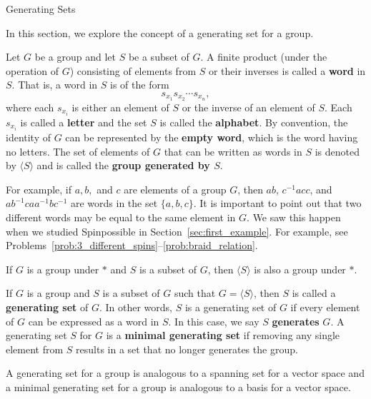 
\begin{section}{Generating Sets}


In this section, we explore the concept of a generating set for a group.

\begin{definition}
Let $G$ be a group and let $S$ be a subset of $G$. A finite product (under the operation of $G$) consisting of elements from $S$ or their inverses is called a \textbf{word} in $S$. That is, a word in $S$ is of the form
\[
s_{x_1}s_{x_2}\cdots s_{x_n},
\]
where each $s_{x_i}$ is either an element of $S$ or the inverse of an element of $S$. Each $s_{x_i}$ is called a \textbf{letter} and the set $S$ is called the \textbf{alphabet}. By convention, the identity of $G$ can be represented by the \textbf{empty word}, which is the word having no letters. The set of elements of $G$ that can be written as words in $S$ is denoted by $\langle S\rangle$ and is called the \textbf{group generated by $S$}.
\end{definition}

For example, if $a, b,$ and $c$ are elements of a group $G$, then $ab$, $c^{-1}acc$, and $ab^{-1}caa^{-1}bc^{-1}$ are words in the set $\{a,b,c\}$.  It is important to point out that two different words may be equal to the same element in $G$. We saw this happen when we studied Spinpossible in Section~\ref{sec:first_example}. For example, see Problems~\ref{prob:3_different_spins}--\ref{prob:braid_relation}.

\begin{theorem}
If $G$ is a group under $*$ and $S$ is a subset of $G$, then $\langle S\rangle$ is also a group under $*$.
\end{theorem}

\begin{definition}
If $G$ is a group and $S$ is a subset of $G$ such that $G=\langle S\rangle$, then $S$ is called a \textbf{generating set} of $G$. In other words, $S$ is a generating set of $G$ if every element of $G$ can be expressed as a word in $S$.  In this case, we say $S$ \textbf{generates} $G$.  A generating set $S$ for $G$ is a \textbf{minimal generating set} if removing any single element from $S$ results in a set that no longer generates the group.
\end{definition}

A generating set for a group is analogous to a spanning set for a vector space and a minimal generating set for a group is analogous to a basis for a vector space.  


\end{section}
